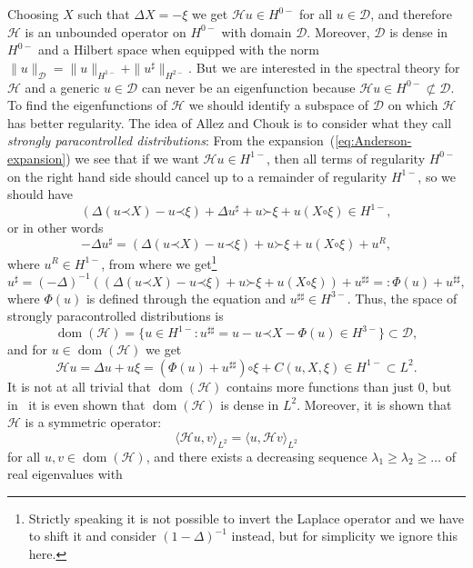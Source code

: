 \documentclass[a4paper, 11pt]{article}
\newcommand{\tmop}[1]{\ensuremath{\operatorname{#1}}}
\newcommand{\tmtextit}[1]{{\itshape{#1}}}
\newcommand{\para}{\mathord{\prec}}
\newcommand{\lpara}{\mathord{\succ}}
\newcommand{\reso}{\mathord{\circ}}
\begin{document}
Choosing $X$ such that $\Delta X = - \xi$ we get $\mathcal{H}u \in H^{0 -}$
for all $u \in \mathcal{D}$, and therefore $\mathcal{H}$ is an unbounded
operator on $H^{0 -}$ with domain $\mathcal{D}$. Moreover, $\mathcal{D}$ is
dense in $H^{0 -}$ and a Hilbert space when equipped with the norm $\| u
\|_{\mathcal{D}} = \| u \|_{H^{1 -}} + \| u^{\sharp} \|_{H^{2 -}}$. But we are
interested in the spectral theory for $\mathcal{H}$ and a generic $u \in
\mathcal{D}$ can never be an eigenfunction because $\mathcal{H}u \in H^{0 -} \not\subset
\mathcal{D}$. To find the eigenfunctions of $\mathcal{H}$ we should identify a
subspace of $\mathcal{D}$ on which $\mathcal{H}$ has better regularity. The
idea of Allez and Chouk is to consider what they call \tmtextit{strongly
paracontrolled distributions}: From the
expansion~(\ref{eq:Anderson-expansion}) we see that if we want $\mathcal{H}u
\in H^{1 -}$, then all terms of regularity $H^{0 -}$ on the right hand side
should cancel up to a remainder of regularity $H^{1 -}$, so we should have
\[ (\Delta (u \para X) - u \para \xi) + \Delta u^{\sharp} + u \lpara \xi + u (X
   \reso \xi) \in H^{1 -}, \]
or in other words
\[ - \Delta u^{\sharp} = (\Delta (u \para X) - u \para \xi) + u \lpara \xi + u
   (X \reso \xi) + u^R, \]
where $u^R \in H^{1 -}$, from where we get\footnote{Strictly speaking it is not possible to invert the Laplace operator
and we have to shift it and consider $(1 - \Delta)^{- 1}$ instead, but for
simplicity we ignore this here.}
\[ u^{\sharp} = (- \Delta)^{- 1} ((\Delta (u \para X) - u \para \xi) + u \lpara
   \xi + u (X \reso \xi)) + u^{\sharp \sharp} = : \Phi (u) + u^{\sharp
   \sharp}, \]
where $\Phi (u)$ is defined through the equation and $u^{\sharp \sharp} \in
H^{3 -}$. Thus, the space of strongly paracontrolled
distributions is
\[ \tmop{dom} (\mathcal{H}) = \{ u \in H^{1 -} : u^{\sharp \sharp} = u - u
   \para X - \Phi (u) \in H^{3 -} \} \subset \mathcal{D}, \]
and for $u \in \tmop{dom} (\mathcal{H})$ we get
\[ \mathcal{H}u = \Delta u + u \xi = (\Phi (u) + u^{\sharp \sharp}) \reso \xi
   + C (u, X, \xi) \in H^{1 -} \subset L^2 . \]
It is not at all trivial that $\tmop{dom} (\mathcal{H})$ contains more
functions than just $0$, but in~\cite{allez_continuous_2015} it is even shown that
$\tmop{dom} (\mathcal{H})$ is dense in $L^2$. Moreover, it is shown that
$\mathcal{H}$ is a symmetric operator:
\[ \langle \mathcal{H}u, v \rangle_{L^2} = \langle u, \mathcal{H}v
   \rangle_{L^2} \]
for all $u, v \in \tmop{dom} (\mathcal{H})$, and there exists a decreasing
sequence $\lambda_1 \geqslant \lambda_2 \geqslant \ldots$ of real eigenvalues with
\end{document}

